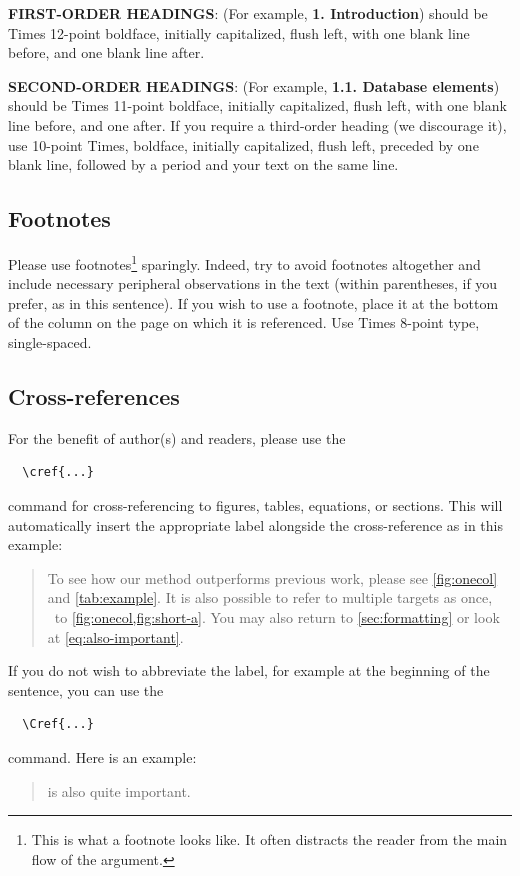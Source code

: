 \documentclass[10pt,twocolumn,letterpaper]{article}
\begin{document}
\textbf{FIRST-ORDER HEADINGS}: (For example, {\large \bf 1. Introduction}) should be Times 12-point boldface, initially capitalized, flush left, with one blank line before, and one blank line after.

\textbf{SECOND-ORDER HEADINGS}: (For example, { \bf 1.1. Database elements}) should be Times 11-point boldface, initially capitalized, flush left, with one blank line before, and one after. If you require a third-order heading (we discourage it), use 10-point Times, boldface, initially capitalized, flush left, preceded by one blank line, followed by a period and your text on the same line. 


\subsection{Footnotes}

Please use footnotes\footnote{This is what a footnote looks like. It often distracts the reader from the main flow of the argument.} sparingly. Indeed, try to avoid footnotes altogether and include necessary peripheral observations in the text (within parentheses, if you prefer, as in this sentence). If you wish to use a footnote, place it at the bottom of the column on the page on which it is referenced. Use Times 8-point type, single-spaced.


\subsection{Cross-references}

For the benefit of author(s) and readers, please use the
{\small\begin{verbatim}
  \cref{...}
\end{verbatim}}  command for cross-referencing to figures, tables, equations, or sections.
This will automatically insert the appropriate label alongside the cross-reference as in this example:
\begin{quotation}
  To see how our method outperforms previous work, please see \cref{fig:onecol} and \cref{tab:example}.
  It is also possible to refer to multiple targets as once, \eg~to \cref{fig:onecol,fig:short-a}.
  You may also return to \cref{sec:formatting} or look at \cref{eq:also-important}.
\end{quotation}
If you do not wish to abbreviate the label, for example at the beginning of the sentence, you can use the
{\small\begin{verbatim}
  \Cref{...}
\end{verbatim}}
command. Here is an example:
\begin{quotation}
   is also quite important.
\end{quotation}
\end{document}
